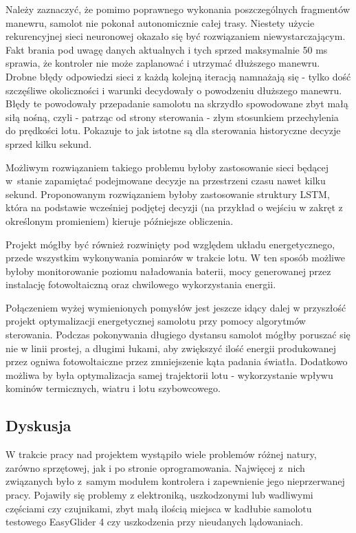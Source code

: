 \documentclass[12pt, a4paper]{article}
\begin{document}
Należy zaznaczyć, że pomimo poprawnego wykonania poszczególnych fragmentów manewru, samolot nie pokonał autonomicznie całej trasy. Niestety użycie rekurencyjnej sieci neuronowej okazało się być rozwiązaniem niewystarczającym. Fakt brania pod uwagę danych aktualnych i tych sprzed maksymalnie 50 ms sprawia, że kontroler nie może zaplanować i utrzymać dłuższego manewru. Drobne błędy odpowiedzi sieci z każdą kolejną iteracją namnażają się - tylko dość szczęśliwe okoliczności i warunki decydowały o powodzeniu dłuższego manewru. Błędy te powodowały przepadanie samolotu na skrzydło spowodowane zbyt małą siłą nośną, czyli - patrząc od strony sterowania - złym stosunkiem przechylenia do prędkości lotu. Pokazuje to jak istotne są dla sterowania historyczne decyzje sprzed kilku sekund.

Możliwym rozwiązaniem takiego problemu byłoby zastosowanie sieci będącej w~stanie zapamiętać podejmowane decyzje na przestrzeni czasu nawet kilku sekund. Proponowanym rozwiązaniem byłoby zastosowanie struktury LSTM, która na podstawie wcześniej podjętej decyzji (na przykład o wejściu w zakręt z określonym promieniem) kieruje późniejsze obliczenia.

Projekt mógłby być również rozwinięty pod względem układu energetycznego, przede wszystkim wykonywania pomiarów w trakcie lotu. W ten sposób możliwe byłoby monitorowanie poziomu naładowania baterii, mocy generowanej przez instalację fotowoltaiczną oraz chwilowego wykorzystania energii.

Połączeniem wyżej wymienionych pomysłów jest jeszcze idący dalej w przyszłość projekt optymalizacji energetycznej samolotu przy pomocy algorytmów sterowania. Podczas pokonywania długiego dystansu samolot mógłby poruszać się nie w linii prostej, a długimi łukami, aby zwiększyć ilość energii produkowanej przez ogniwa fotowoltaiczne przez zmniejszenie kąta padania światła. Dodatkowo możliwa by była optymalizacja samej trajektorii lotu - wykorzystanie wpływu kominów termicznych, wiatru i lotu szybowcowego.



\subsection{Dyskusja}
W trakcie pracy nad projektem wystąpiło wiele problemów różnej natury, zarówno sprzętowej, jak i po stronie oprogramowania. Najwięcej z~nich związanych było z~samym modułem kontrolera i zapewnienie jego nieprzerwanej pracy. Pojawiły się problemy z elektroniką, uszkodzonymi lub wadliwymi częściami czy czujnikami, zbyt małą ilością miejsca w kadłubie samolotu testowego EasyGlider 4 czy uszkodzenia przy nieudanych lądowaniach. 
\end{document}
